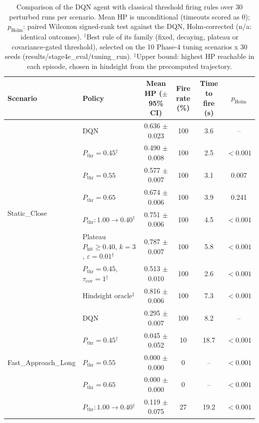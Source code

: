 \begin{table}[htbp]
\centering
\caption{Comparison of the DQN agent with classical threshold firing rules over 30 perturbed runs per scenario. Mean HP is unconditional (timeouts scored as 0); $p_{\mathrm{Holm}}$: paired Wilcoxon signed-rank test against the DQN, Holm-corrected (n/a: identical outcomes). $^{\dagger}$Best rule of its family (fixed, decaying, plateau or covariance-gated threshold), selected on the 10 Phase-4 tuning scenarios x 30 seeds (results/stage4e_eval/tuning_run). $^{\ddagger}$Upper bound: highest HP reachable in each episode, chosen in hindsight from the precomputed trajectory.}
\label{tab:comparison-traditional-rl}
\small
\begin{tabular}{llcccc}
\toprule
\textbf{Scenario} & \textbf{Policy} & \textbf{Mean HP ($\pm$95\% CI)} & \textbf{Fire rate (\%)} & \textbf{Time to fire (s)} & $p_{\mathrm{Holm}}$ \\
\midrule
\multirow{8}{*}{Static\_Close} & DQN & 0.636 $\pm$ 0.023 & 100 & 3.6 & -- \\
 & $P_{\mathrm{thr}}=0.45$$^{\dagger}$ & 0.490 $\pm$ 0.008 & 100 & 2.5 & $<0.001$ \\
 & $P_{\mathrm{thr}}=0.55$ & 0.577 $\pm$ 0.007 & 100 & 3.1 & 0.007 \\
 & $P_{\mathrm{thr}}=0.65$ & 0.674 $\pm$ 0.006 & 100 & 3.9 & 0.241 \\
 & $P_{\mathrm{thr}}: 1.00 \to 0.40$$^{\dagger}$ & 0.751 $\pm$ 0.006 & 100 & 4.5 & $<0.001$ \\
 & Plateau $P_{\mathrm{hit}}\geq0.40$, $k=3$, $\varepsilon=0.01$$^{\dagger}$ & 0.787 $\pm$ 0.007 & 100 & 5.8 & $<0.001$ \\
 & $P_{\mathrm{thr}}=0.45$, $\tau_{\mathrm{cov}}=1$$^{\dagger}$ & 0.513 $\pm$ 0.010 & 100 & 2.6 & $<0.001$ \\
 & Hindsight oracle$^{\ddagger}$ & 0.816 $\pm$ 0.006 & 100 & 7.3 & $<0.001$ \\
\midrule
\multirow{8}{*}{Fast\_Approach\_Long} & DQN & 0.295 $\pm$ 0.007 & 100 & 8.2 & -- \\
 & $P_{\mathrm{thr}}=0.45$$^{\dagger}$ & 0.045 $\pm$ 0.052 & 10 & 18.7 & $<0.001$ \\
 & $P_{\mathrm{thr}}=0.55$ & 0.000 $\pm$ 0.000 & 0 & -- & $<0.001$ \\
 & $P_{\mathrm{thr}}=0.65$ & 0.000 $\pm$ 0.000 & 0 & -- & $<0.001$ \\
 & $P_{\mathrm{thr}}: 1.00 \to 0.40$$^{\dagger}$ & 0.119 $\pm$ 0.075 & 27 & 19.2 & $<0.001$ \\

\end{tabular}
\end{table}

